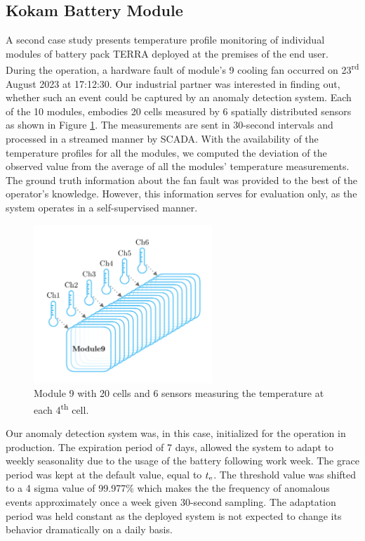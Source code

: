 \subsection{Kokam Battery Module}\label{AA:Kokam}
A second case study presents temperature profile monitoring of individual modules of battery pack TERRA deployed at the premises of the end user. During the operation, a hardware fault of module's 9 cooling fan occurred on 23\textsuperscript{rd} August 2023 at 17:12:30. Our industrial partner was interested in finding out, whether such an event could be captured by an anomaly detection system. Each of the 10 modules, embodies 20 cells measured by 6 spatially distributed sensors as shown in Figure \ref{fig:kokam_module}. The measurements are sent in 30-second intervals and processed in a streamed manner by SCADA. With the availability of the temperature profiles for all the modules, we computed the deviation of the observed value from the average of all the modules' temperature measurements. The ground truth information about the fan fault was provided to the best of the operator's knowledge. However, this information serves for evaluation only, as the system operates in a self-supervised manner.

\begin{figure}[htbp]
\centering
 \includegraphics[width=0.6\textwidth]{figures/Kokam_module9_measure points.pdf}
 \caption{Module 9 with 20 cells and 6 sensors measuring the temperature at each 4\textsuperscript{th} cell.}
 \label{fig:kokam_module}
\end{figure}

Our anomaly detection system was, in this case, initialized for the operation in production. The expiration period of 7 days, allowed the system to adapt to weekly seasonality due to the usage of the battery following work week. The grace period was kept at the default value, equal to $t _{\text{e}}$. The threshold value was shifted to a 4 sigma value of 99.977\% which makes the the frequency of anomalous events approximately once a week given 30-second sampling. The adaptation period was held constant as the deployed system is not expected to change its behavior dramatically on a daily basis.

